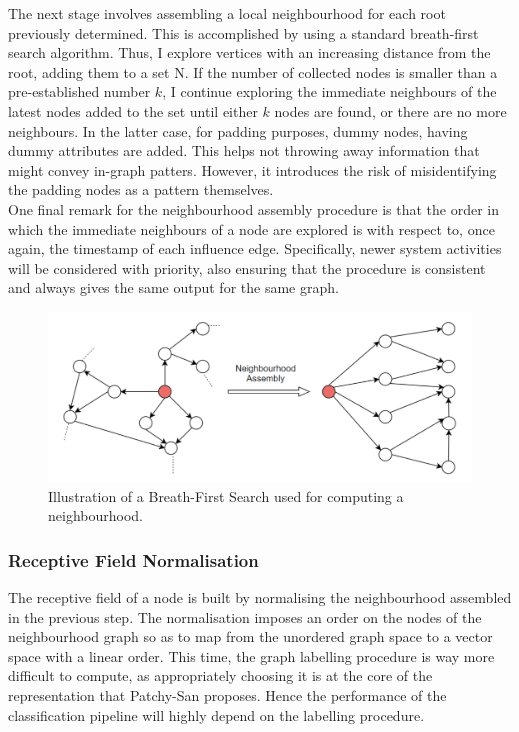 The next stage involves assembling a local neighbourhood for each root previously determined. This is accomplished by using a standard breath-first search algorithm. Thus, I explore vertices with an increasing distance from the root, adding them to a set N. If the number of collected nodes is smaller than a pre-established number $k$, I continue exploring the immediate neighbours of the latest nodes added to the set until either $k$ nodes are found, or there are no more neighbours. In the latter case, for padding purposes, dummy nodes, having dummy attributes are added. This helps not throwing away information that might convey in-graph patters. However, it introduces the risk of misidentifying the padding nodes as a pattern themselves. \\

One final remark for the neighbourhood assembly procedure is that the order in which the immediate neighbours of a node are explored is with respect to, once again, the timestamp of each influence edge. Specifically, newer system activities will be considered with priority, also ensuring that the procedure is consistent and always gives the same output for the same graph. \\

\begin{figure}[H]
  \centering
  \includegraphics[scale=0.375]{Images/neighassemb2.png}
  \caption{Illustration of a Breath-First Search used for computing a neighbourhood.}
  \label{neighassemb}
\end{figure}


\subsubsection*{Receptive Field Normalisation}

The receptive field of a node is built by normalising the neighbourhood assembled in the previous step. The normalisation imposes an order on the nodes of the neighbourhood graph so as to map from the unordered graph space to a vector space with a linear order. This time, the graph labelling procedure is way more difficult to compute, as appropriately choosing it is at the core of the representation that Patchy-San proposes. Hence the performance of the classification pipeline will highly depend on the labelling procedure. \\


